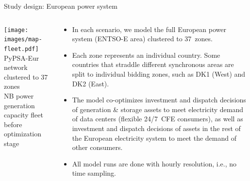 \begin{frame}{Study design: European power system}
  
  {\footnotesize
  \begin{columns}[T]

  \begin{column}{7cm}
  \centering
  \vspace{0.5cm}
  \texttt{[image: images/map-fleet.pdf]}
  {\scriptsize   PyPSA-Eur network clustered to 37 zones \\ 
  NB power generation capacity fleet before optimization stage}
  \end{column}

  \begin{column}{8cm}
  \begin{itemize}
  \item In each scenario, we model the full European power system (ENTSO-E area) 
  clustered to \alert{37~zones}.

  \item Each zone represents an individual country. Some countries
  that straddle different synchronous areas are split to individual bidding zones, 
  such as DK1 (West) and DK2 (East).

  \item The model \alert{co-optimizes} investment and dispatch decisions of generation \& storage assets to meet electricity demand of data centers (flexible 24/7~CFE consumers), as well as investment and dispatch decisions of assets in the rest of the European electricity system to meet the demand of other consumers. 

  \item All model runs are done with \alert{hourly resolution}, i.e., no time sampling.
  
  \end{itemize}

  \end{column}
  \end{columns}
  }

\end{frame}



